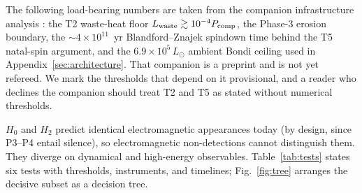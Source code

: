 \documentclass[11pt]{article}
\begin{document}
\noindent
The following load-bearing numbers are taken from the companion infrastructure analysis \citep{Swanson2026Engineered}: the T2 waste-heat floor $L_{\rm waste} \gtrsim 10^{-4}P_{\rm comp}$, the Phase-3 erosion boundary, the $\sim$$4\times10^{11}$~yr Blandford--Znajek spindown time behind the T5 natal-spin argument, and the $6.9\times10^{5}\,L_\odot$ ambient Bondi ceiling used in Appendix~\ref{sec:architecture}. That companion is a preprint and is not yet refereed. We mark the thresholds that depend on it provisional, and a reader who declines the companion should treat T2 and T5 as stated without numerical thresholds.

$H_0$ and $H_2$ predict identical electromagnetic appearances today (by design, since P3--P4 entail silence), so electromagnetic non-detections cannot distinguish them. They diverge on dynamical and high-energy observables. Table~\ref{tab:tests} states six tests with thresholds, instruments, and timelines; Fig.~\ref{fig:tree} arranges the decisive subset as a decision tree.
\end{document}
